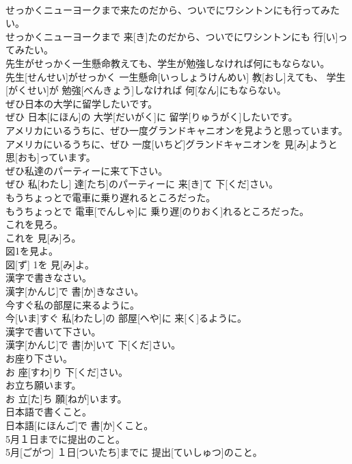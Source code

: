 \documentclass[8pt]{extreport}
\begin{document}
\begin{CJK}{UTF8}{min}
\\	せっかくニューヨークまで来たのだから、ついでにワシントンにも行ってみたい。	
\\	せっかくニューヨークまで 来[き]たのだから、ついでにワシントンにも 行[い]ってみたい。
\\	先生がせっかく一生懸命教えても、学生が勉強しなければ何にもならない。	
\\	先生[せんせい]がせっかく 一生懸命[いっしょうけんめい] 教[おし]えても、 学生[がくせい]が 勉強[べんきょう]しなければ 何[なん]にもならない。
\\	ぜひ日本の大学に留学したいです。	
\\	ぜひ 日本[にほん]の 大学[だいがく]に 留学[りゅうがく]したいです。
\\	アメリカにいるうちに、ぜひ一度グランドキャニオンを見ようと思っています。	
\\	アメリカにいるうちに、ぜひ 一度[いちど]グランドキャニオンを 見[み]ようと 思[おも]っています。
\\	ぜひ私達のパーティーに来て下さい。	
\\	ぜひ 私[わたし] 達[たち]のパーティーに 来[き]て 下[くだ]さい。
\\	もうちょっとで電車に乗り遅れるところだった。	
\\	もうちょっとで 電車[でんしゃ]に 乗り遅[のりおく]れるところだった。
\\	これを見ろ。	
\\	これを 見[み]ろ。
\\	図1を見よ。	
\\	図[ず] 1を 見[み]よ。
\\	漢字で書きなさい。	
\\	漢字[かんじ]で 書[か]きなさい。
\\	今すぐ私の部屋に来るように。	
\\	今[いま]すぐ 私[わたし]の 部屋[へや]に 来[く]るように。
\\	漢字で書いて下さい。	
\\	漢字[かんじ]で 書[か]いて 下[くだ]さい。
\\	お座り下さい。	
\\	お 座[すわ]り 下[くだ]さい。
\\	お立ち願います。	
\\	お 立[た]ち 願[ねが]います。
\\	日本語で書くこと。	
\\	日本語[にほんご]で 書[か]くこと。
\\	5月１日までに提出のこと。	
\\	5月[ごがつ] １日[ついたち]までに 提出[ていしゅつ]のこと。

\end{CJK}
\end{document}
